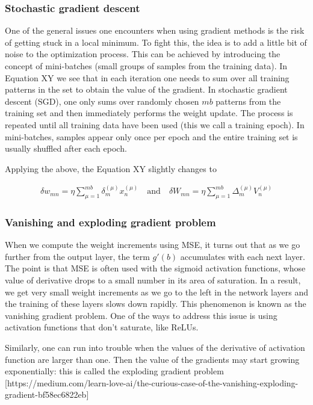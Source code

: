 \subsubsection{Stochastic gradient descent}

One of the general issues one encounters when using gradient methods is the risk of getting stuck in a local minimum. To fight this, the idea is to add a little bit of noise to the optimization process. This can be achieved by introducing the concept of mini-batches (small groups of samples from the training data). In Equation XY we see that in each iteration one needs to sum over all training patterns in the set to obtain the value of the gradient. In stochastic gradient descent (SGD), one only sums over randomly chosen $ mb $ patterns from the training set and then immediately performs the weight update. The process is repeated until all training data have been used (this we call a training epoch). In mini-batches, samples appear only once per epoch and the entire training set is usually shuffled after each epoch.

Applying the above, the Equation XY slightly changes to

\begin{gather}
\delta w_{mn} = \eta \sum\limits_{\mu=1}^{mb} \delta_{m}^{(\mu)} x_{n}^{(\mu)}
\quad \text{and} \quad 
\delta W_{mn} = \eta \sum\limits_{\mu=1}^{mb} \Delta_{m}^{(\mu)} V_{n}^{(\mu)}	
\end{gather}

\subsubsection{Vanishing and exploding gradient problem}

When we compute the weight increments using MSE, it turns out that as we go further from the output layer, the term $ g'(b) $ accumulates with each next layer. The point is that MSE is often used with the sigmoid activation functions, whose value of derivative drops to a small number in its area of saturation. In a result, we get very small weight increments as we go to the left in the network layers and the training of these layers slows down rapidly. This phenomenon is known as the vanishing gradient problem. One of the ways to address this issue is using activation functions that don't saturate, like ReLUs.

Similarly, one can run into trouble when the values of the derivative of activation function are larger than one. Then the value of the gradients may start growing exponentially: this is called the exploding gradient problem [https://medium.com/learn-love-ai/the-curious-case-of-the-vanishing-exploding-gradient-bf58ec6822eb]

